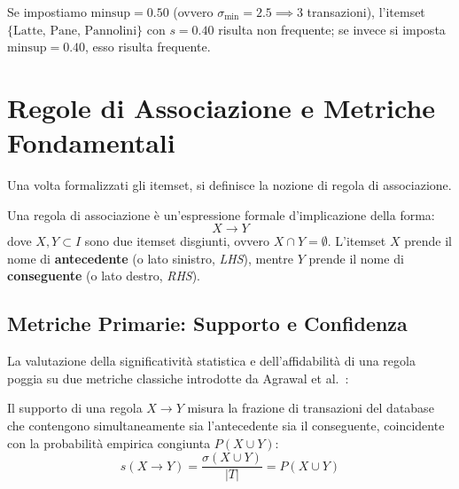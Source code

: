 Se impostiamo $\mathrm{minsup} = 0.50$ (ovvero $\sigma_{\min} = 2.5 \implies 3$ transazioni), l'itemset $\{\text{Latte, Pane, Pannolini}\}$ con $s = 0.40$ risulta non frequente; se invece si imposta $\mathrm{minsup} = 0.40$, esso risulta frequente.

\FloatBarrier
\section{Regole di Associazione e Metriche Fondamentali}
\label{sec:dm-association-rules-metrics}

Una volta formalizzati gli itemset, si definisce la nozione di regola di associazione.

\begin{definition}
Una regola di associazione è un'espressione formale d'implicazione della forma:
\begin{equation}
\label{eq:dm-rule-definition}
X \longrightarrow Y
\end{equation}
dove $X, Y \subset I$ sono due itemset disgiunti, ovvero $X \cap Y = \emptyset$. L'itemset $X$ prende il nome di \textbf{antecedente} (o lato sinistro, \textit{LHS}), mentre $Y$ prende il nome di \textbf{conseguente} (o lato destro, \textit{RHS}).
\end{definition}

\FloatBarrier
\subsection{Metriche Primarie: Supporto e Confidenza}
La valutazione della significatività statistica e dell'affidabilità di una regola poggia su due metriche classiche introdotte da Agrawal et al.~\cite{agrawal1993, tan2018}:

\begin{definition}
Il supporto di una regola $X \rightarrow Y$ misura la frazione di transazioni del database che contengono simultaneamente sia l'antecedente sia il conseguente, coincidente con la probabilità empirica congiunta $P(X \cup Y)$:
\begin{equation}
\label{eq:dm-rule-support}
s(X \longrightarrow Y) = \frac{\sigma(X \cup Y)}{|T|} = P(X \cup Y)
\end{equation}
\end{definition}

